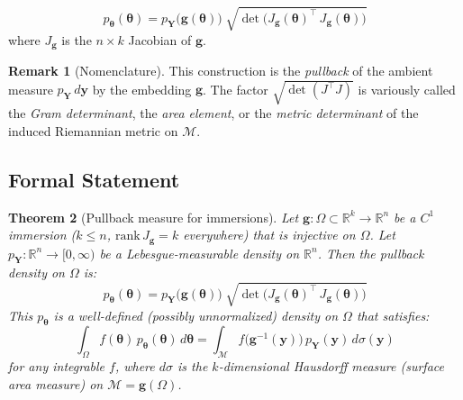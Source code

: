 \documentclass[11pt,a4paper]{article}
\newtheorem{theorem}{Theorem}[section]
\theoremstyle{definition}
\newtheorem{remark}[theorem]{Remark}
\newcommand{\btheta}{\boldsymbol{\theta}}
\begin{document}
\begin{keyresult}
\begin{equation}
    \label{eq:pullback}
    \boxed{
    p_{\btheta}(\btheta) = p_{\mathbf{Y}}\!\big(\mathbf{g}(\btheta)\big) \;
    \sqrt{\det\!\big(J_{\mathbf{g}}(\btheta)^\top \,
    J_{\mathbf{g}}(\btheta)\big)}
    }
\end{equation}
where $J_{\mathbf{g}}$ is the $n \times k$ Jacobian of $\mathbf{g}$.
\end{keyresult}

\begin{remark}[Nomenclature]
This construction is the \emph{pullback} of the ambient measure
$p_{\mathbf{Y}} \, d\mathbf{y}$ by the embedding $\mathbf{g}$. The factor
$\sqrt{\det(J^\top J)}$ is variously called the \emph{Gram determinant}, the
\emph{area element}, or the \emph{metric determinant} of the induced
Riemannian metric on $\mathcal{M}$.
\end{remark}

\subsection{Formal Statement}

\begin{theorem}[Pullback measure for immersions]
\label{thm:pullback}
Let $\mathbf{g}: \Omega \subset \mathbb{R}^k \to \mathbb{R}^n$ be a $C^1$
immersion ($k \leq n$, $\text{rank}\, J_{\mathbf{g}} = k$ everywhere) that is
injective on $\Omega$. Let $p_{\mathbf{Y}}: \mathbb{R}^n \to [0, \infty)$ be a
Lebesgue-measurable density on $\mathbb{R}^n$. Then the pullback density on
$\Omega$ is:
\begin{equation}
    p_{\btheta}(\btheta) = p_{\mathbf{Y}}\!\big(\mathbf{g}(\btheta)\big) \;
    \sqrt{\det\!\big(J_{\mathbf{g}}(\btheta)^\top \,
    J_{\mathbf{g}}(\btheta)\big)}
\end{equation}
This $p_{\btheta}$ is a well-defined (possibly unnormalized) density on
$\Omega$ that satisfies:
\begin{equation}
    \int_\Omega f(\btheta) \, p_{\btheta}(\btheta) \, d\btheta
    = \int_{\mathcal{M}} f\!\big(\mathbf{g}^{-1}(\mathbf{y})\big) \,
    p_{\mathbf{Y}}(\mathbf{y}) \, d\sigma(\mathbf{y})
\end{equation}
for any integrable $f$, where $d\sigma$ is the $k$-dimensional Hausdorff
measure (surface area measure) on $\mathcal{M} = \mathbf{g}(\Omega)$.
\end{theorem}
\end{document}
